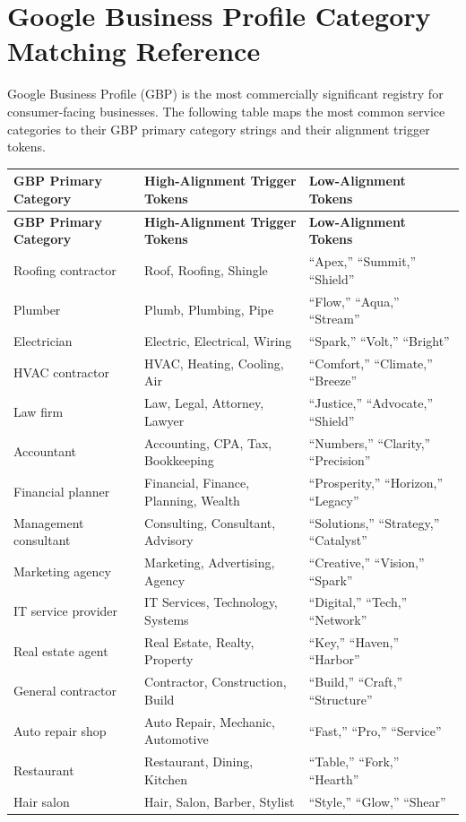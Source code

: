 \documentclass[12pt, openany]{book}
\theoremstyle{thmstyle}
\theoremstyle{defstyle}
\begin{document}
\section{Google Business Profile Category Matching Reference}

Google Business Profile (GBP) is the most commercially significant registry for consumer-facing businesses. The following table maps the most common service categories to their GBP primary category strings and their alignment trigger tokens.

\begin{longtable}{p{2.0in}p{2.0in}p{1.5in}}
\toprule
\textbf{GBP Primary Category} & \textbf{High-Alignment Trigger Tokens} & \textbf{Low-Alignment Tokens} \\
\midrule
\endfirsthead
\toprule
\textbf{GBP Primary Category} & \textbf{High-Alignment Trigger Tokens} & \textbf{Low-Alignment Tokens} \\
\midrule
\endhead
\bottomrule
\endlastfoot
Roofing contractor & Roof, Roofing, Shingle & ``Apex,'' ``Summit,'' ``Shield'' \\
Plumber & Plumb, Plumbing, Pipe & ``Flow,'' ``Aqua,'' ``Stream'' \\
Electrician & Electric, Electrical, Wiring & ``Spark,'' ``Volt,'' ``Bright'' \\
HVAC contractor & HVAC, Heating, Cooling, Air & ``Comfort,'' ``Climate,'' ``Breeze'' \\
Law firm & Law, Legal, Attorney, Lawyer & ``Justice,'' ``Advocate,'' ``Shield'' \\
Accountant & Accounting, CPA, Tax, Bookkeeping & ``Numbers,'' ``Clarity,'' ``Precision'' \\
Financial planner & Financial, Finance, Planning, Wealth & ``Prosperity,'' ``Horizon,'' ``Legacy'' \\
Management consultant & Consulting, Consultant, Advisory & ``Solutions,'' ``Strategy,'' ``Catalyst'' \\
Marketing agency & Marketing, Advertising, Agency & ``Creative,'' ``Vision,'' ``Spark'' \\
IT service provider & IT Services, Technology, Systems & ``Digital,'' ``Tech,'' ``Network'' \\
Real estate agent & Real Estate, Realty, Property & ``Key,'' ``Haven,'' ``Harbor'' \\
General contractor & Contractor, Construction, Build & ``Build,'' ``Craft,'' ``Structure'' \\
Auto repair shop & Auto Repair, Mechanic, Automotive & ``Fast,'' ``Pro,'' ``Service'' \\
Restaurant & Restaurant, Dining, Kitchen & ``Table,'' ``Fork,'' ``Hearth'' \\
Hair salon & Hair, Salon, Barber, Stylist & ``Style,'' ``Glow,'' ``Shear'' \\
\end{longtable}
\end{document}
